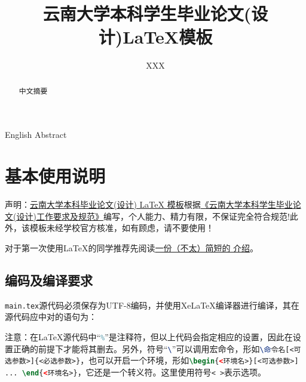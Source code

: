 \documentclass{YNUbachelor}
\title{云南大学本科学生毕业论文(设计)\;\LaTeX 模板}
\author{XXX}
\begin{document}
	
	\cover
	
	\copyrightpage
	
	\maketitle

	\toc

	\begin{abstract}
		中文摘要
	\end{abstract}


	\begin{enabstract}
		English Abstract
	\end{enabstract}

		
	\section{基本使用说明}
		声明：\href{https://gitee.com/Astro-Lee/YNU-thesis-bachelor}{云南大学本科毕业论文(设计) LaTeX 模板}根据\href{http://www.jwc.ynu.edu.cn/info/1003/2052.htm}{《云南大学本科学生毕业论文(设计)工作要求及规范》}编写，个人能力、精力有限，不保证完全符合规范!此外，该模板未经学校官方核准，如有顾虑，请不要使用！
		
		对于第一次使用\LaTeX 的同学推荐先阅读\href{http://mirrors.ctan.org/info/lshort/chinese/lshort-zh-cn.pdf}{一份（不太）简短的 \LaTeXe 介绍}。
		
		\subsection{编码及编译要求}
		\lstinline[language=latex]|main.tex|源代码必须保存为UTF-8编码，并使用XeLaTeX编译器进行编译，其在源代码应中对的语句为：
		
	\begin{latexcode}
	\end{latexcode}
		
		注意：在\LaTeX 源代码中``\lstinline[language=latex]|%|''是注释符，但以上代码会指定相应的设置，因此在设置正确的前提下才能将其删去。另外，符号``\lstinline[language=latex]|\|''可以调用宏命令，形如\lstinline[language=latex]|\命令名[<可选参数>]{<必选参数>}|，也可以开启一个环境，形如\lstinline[language=latex]|\begin{<环境名>}[<可选参数>] ... \end{<环境名>}|，它还是一个转义符。这里使用符号\lstinline[language=latex]|< >|表示选项。
		
\end{document}

